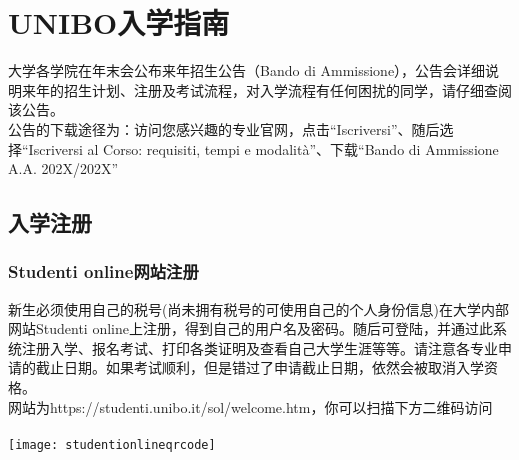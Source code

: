 \chapter{UNIBO入学指南}              

大学各学院在年末会公布来年招生公告（Bando di Ammissione），公告会详细说明来年的招生计划、注册及考试流程，对入学流程有任何困扰的同学，请仔细查阅该公告。\\
公告的下载途径为：访问您感兴趣的专业官网，点击“Iscriversi”、随后选择“Iscriversi al Corso: requisiti, tempi e modalità”、下载“Bando di Ammissione A.A. 202X/202X”
\section{入学注册}

\subsection{Studenti online网站注册}
新生必须使用自己的税号(尚未拥有税号的可使用自己的个人身份信息)在大学内部网站Studenti online上注册，得到自己的用户名及密码。随后可登陆，并通过此系统注册入学、报名考试、打印各类证明及查看自己大学生涯等等。请注意各专业申请的截止日期。如果考试顺利，但是错过了申请截止日期，依然会被取消入学资格。\\
网站为https://studenti.unibo.it/sol/welcome.htm，你可以扫描下方二维码访问\\
\\
\texttt{[image: studentionlineqrcode]}\\


